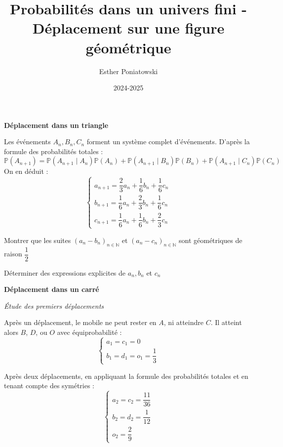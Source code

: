 \documentclass[10pt,a4paper]{article}
\title{Probabilités dans un univers fini - Déplacement sur une figure géométrique}
\author{Esther Poniatowski}
\date{2024-2025}
\begin{document}
\textbf{Déplacement dans un triangle}

\q Les événements \( A_n, B_n, C_n \) forment un système complet d'événements. D'après la formule
des probabilités totales :
\[
\mathbb{P}(A_{n+1}) = \mathbb{P}(A_{n+1} \mid A_n) \mathbb{P}(A_n) + \mathbb{P}(A_{n+1} \mid B_n) \mathbb{P}(B_n) + \mathbb{P}(A_{n+1} \mid C_n) \mathbb{P}(C_n)
\]
On en déduit :
\[
\begin{cases}
a_{n+1} = \dfrac{2}{3} a_n + \dfrac{1}{6} b_n + \dfrac{1}{6} c_n \\
b_{n+1} = \dfrac{1}{6} a_n + \dfrac{2}{3} b_n + \dfrac{1}{6} c_n \\
c_{n+1} = \dfrac{1}{6} a_n + \dfrac{1}{6} b_n + \dfrac{2}{3} c_n
\end{cases}
\]

\q Montrer que les suites \( (a_n - b_n)_{n \in \mathbb{N}} \) et \( (a_n - c_n)_{n \in \mathbb{N}}
\) sont géométriques de raison \( \dfrac{1}{2} \)

\q Déterminer des expressions explicites de \( a_n, b_n \) et \( c_n \)


\bigskip
\textbf{Déplacement dans un carré}

\q \emph{Étude des premiers déplacements}

Après un déplacement, le mobile ne peut rester en \( A \), ni atteindre \( C \). Il atteint alors \(
B \), \( D \), ou \( O \) avec équiprobabilité :
\[
\begin{cases}
a_1 = c_1 = 0 \\
b_1 = d_1 = o_1 = \dfrac{1}{3}
\end{cases}
\]

Après deux déplacements, en appliquant la formule des probabilités totales et en tenant compte des
symétries :
\[
\begin{cases}
a_2 = c_2 = \dfrac{11}{36} \\
b_2 = d_2 = \dfrac{1}{12} \\
o_2 = \dfrac{2}{9}
\end{cases}
\]
\end{document}

